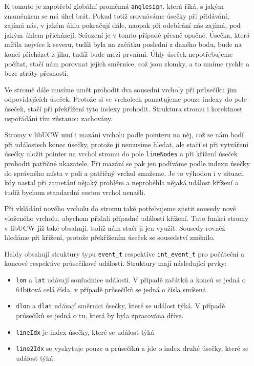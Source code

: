 K tomuto je zapotřebí globální proměnná \verb|anglesign|, která říká, s jakým
znaménkem se má úhel brát. Pokud totiž srovnáváme úsečky při přidávání, zajímá
nás, v jakém úhlu pokračují dále, naopak při odebírání nás zajímá, pod jakým
úhlem přicházejí. Seřazení je v tomto případě přesně opačné. Úsečka, která
mířila nejvíce k severu, tudíž byla na začátku poslední z daného bodu, bude na
konci přicházet z jihu, tudíž bude mezi prvními. Úhly úseček nepotřebujeme
počítat, stačí nám porovnat jejich směrnice, což jsou zlomky, a to umíme rychle
a beze ztráty přesnosti.

Ve stromě dále musíme umět prohodit dva sousední vrcholy při průsečíku jim
odpovídajících úseček. Protože si ve vrcholech pamatujeme pouze indexy do pole
úseček, stačí při překřížení tyto indexy prohodit. Struktura stromu i korektnost
uspořádání tím zůstanou zachovány.

Stromy v libUCW umí i mazání vrcholu podle pointeru na něj, což se nám hodí při
událostech konec úsečky, protože ji nemusíme hledat, ale stačí si při vytváření
úsečky uložit pointer na vrchol stromu do pole \verb|lineNodes| a při křížení
úseček prohodit patřičné ukazatele. Při mazání se pak jen podíváme podle indexu
úsečky do správného místa v poli a patřičný vrchol smažeme. Je to výhodou i v
situaci, kdy nastal při zametání nějaký problém a neproběhla nějaká událost
křížení a tudíž bychom standardní cestou vrchol nenašli.

Při vkládání nového vrcholu do stromu také potřebujeme zjistit sousedy nově
vloženého vrcholu, abychom přidali případné události křížení. Tuto funkci stromy
v libUCW již také obsahují, tudíž nám stačí ji jen využít. Sousedy rovněž
hledáme při křížení, protože překřížením úseček se sousedství změnilo.

Haldy obsahují struktury typu \verb|event_t| respektive \verb|int_event_t| pro
počáteční a koncové respektive průsečíkové události. Struktury mají následující
prvky:
\begin{itemize}
	\item \verb|lon| a \verb|lat| udávají souřadnice události. V případě
	začátků a konců se jedná o 64bitová celá čísla, v případě průsečíků se
	jedná o čísla smíšená. 
	\item \verb|dlon| a \verb|dlat| udávají směrnici úsečky, které se
	událost týká. V případě průsečíků se jedná o tu, která by byla
	zpracována dříve.
	\item \verb|lineIdx| je index úsečky, které se událost týká
	\item \verb|line2Idx| se vyskytuje pouze u průsečíků a jde o index druhé
	úsečky, které se událost týká.
\end{itemize}

